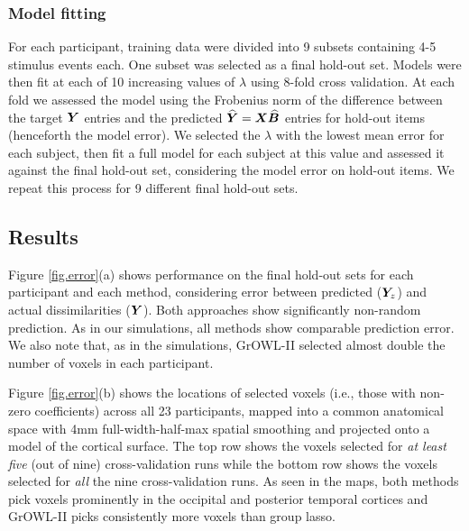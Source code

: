 \subsubsection*{Model fitting}
For each participant, training data were divided into 9 subsets containing 4-5
stimulus events each. One subset was selected as a final hold-out set. Models
were then fit at each of 10 increasing values of $\lambda$ using 8-fold cross
validation. At each fold we assessed the model using the Frobenius norm of the
difference between the target $\boldsymbol{Y}$ entries and the predicted $\boldsymbol{\widehat{Y}} =
\boldsymbol{X}\widehat{\boldsymbol{B}}$ entries for hold-out items (henceforth the model error). We
selected the $\lambda$ with the lowest mean error for each subject, then fit a
full model for each subject at this value and assessed it against the final
hold-out set, considering the model error on hold-out items. We repeat this
process for 9 different final hold-out sets.

\subsection{Results}
Figure \ref{fig.error}(a) shows performance on the final hold-out sets for each
participant and each method, considering error between predicted ($\boldsymbol{Y}_z$) and
actual dissimilarities ($\boldsymbol{Y}$). Both approaches show significantly non-random
prediction. As in our simulations, all methods show comparable prediction error.
We also note that, as in the simulations, GrOWL-II selected almost double the
number of voxels in each participant.

Figure \ref{fig.error}(b) shows the locations of selected voxels (i.e., those
with non-zero coefficients) across all 23 participants, mapped into a common
anatomical space with 4mm full-width-half-max spatial smoothing and projected
onto a model of the cortical surface. The top row shows the voxels selected for
\textit{at least five} (out of nine) cross-validation runs while the bottom row
shows the voxels selected for \textit{all} the nine cross-validation runs. As
seen in the maps, both methods pick voxels prominently in the occipital and
posterior temporal cortices and GrOWL-II picks consistently more voxels than
group lasso.

